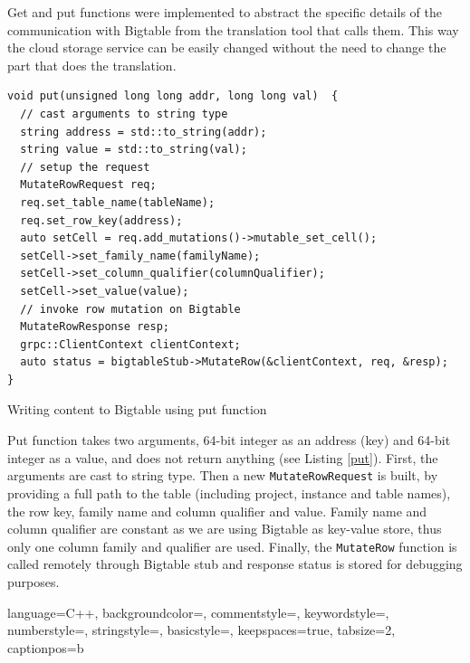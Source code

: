 \documentclass[bsc,frontabs,twoside,singlespacing,parskip,deptreport]{infthesis}     %
\begin{document}
Get and put functions were implemented to abstract the specific details of the communication with Bigtable from the translation tool that calls them. This way the cloud storage service can be easily changed without the need to change the part that does the translation. 

\begin{listing}[H]
\begin{verbatim}
void put(unsigned long long addr, long long val)  {
  // cast arguments to string type
  string address = std::to_string(addr);
  string value = std::to_string(val);
  // setup the request
  MutateRowRequest req;
  req.set_table_name(tableName);
  req.set_row_key(address);
  auto setCell = req.add_mutations()->mutable_set_cell();
  setCell->set_family_name(familyName);
  setCell->set_column_qualifier(columnQualifier);
  setCell->set_value(value);
  // invoke row mutation on Bigtable
  MutateRowResponse resp;
  grpc::ClientContext clientContext;
  auto status = bigtableStub->MutateRow(&clientContext, req, &resp);
}
\end{verbatim}
\caption{Writing content to Bigtable using put function}
\label{put}
\end{listing}

Put function takes two arguments, 64-bit integer as an address (key) and 64-bit integer as a value, and does not return anything (see Listing \ref{put}). First, the arguments are cast to string type. Then a new \texttt{MutateRowRequest} is built, by providing a full path to the table (including project, instance and table names), the row key, family name and column qualifier and value. Family name and column qualifier are constant as we are using Bigtable as key-value store, thus only one column family and qualifier are used. Finally, the \texttt{MutateRow} function is called remotely through Bigtable stub and response status is stored for debugging purposes.

 {
  language=C++,
  backgroundcolor=\color{backcolour},   
  commentstyle=\color{codegreen},
  keywordstyle=\color{Maroon},
  numberstyle=\tiny\color{codegray},
  stringstyle=\color{magenta},
  basicstyle=\footnotesize,                 
  keepspaces=true,                                           
  tabsize=2,
  captionpos=b
}
\end{document}

